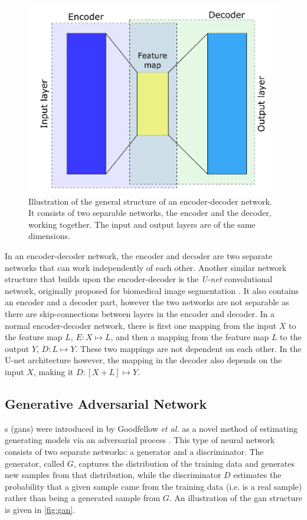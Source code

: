 \begin{figure}[htbp]  
    \centering
    \includegraphics[width=.7\textwidth]{figures/encoderdecoder.pdf}
    \caption[Illustration of an encoder-decoder network]{Illustration of the general structure of an encoder-decoder network. It consists of two separable networks, the encoder and the decoder, working together. The input and output layers are of the same dimensions. }
    \label{fig:encoderdecoder}
\end{figure}

In an encoder-decoder network, the encoder and decoder are two separate networks that can work independently of each other. Another similar network structure that builds upon the encoder-decoder is the \textit{U-net} convolutional network, originally proposed for biomedical image segmentation \cite{unet}. It also contains an encoder and a decoder part, however the two networks are not separable as there are skip-connections between layers in the encoder and decoder. In a normal encoder-decoder network, there is first one mapping from the input $X$ to the feature map $L$, $E\colon X \mapsto L$, and then a mapping from the feature map $L$ to the output $Y$, $D\colon L \mapsto Y$. These two mappings are not dependent on each other. In the U-net architecture however,  the mapping in the decoder also depends on the input $X$, making it $D\colon [X+L] \mapsto Y$. 


\subsection{Generative Adversarial Network}
\label{sec:ml:types:gan}
s (\gls{gan}s) were introduced in \citeyear{goodfellow2014gan} by Goodfellow \textit{et al.} as a novel method of estimating generating models via an adversarial process \cite{goodfellow2014gan}. This type of neural network consists of two separate networks: a generator and a discriminator. The generator, called $G$, captures the distribution of the training data and generates new samples from that distribution, while the discriminator $D$ estimates the probability that a given sample came from the training data (i.e. is a real sample) rather than being a generated sample from $G$. An illustration of the \gls{gan} structure is given in \cref{fig:gan}. 

